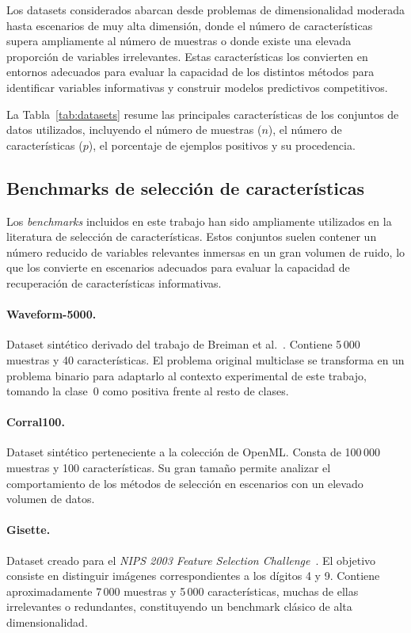 Los datasets considerados abarcan desde problemas de dimensionalidad moderada hasta escenarios de muy alta dimensión, donde el número de características supera ampliamente al número de muestras o donde existe una elevada proporción de variables irrelevantes. Estas características los convierten en entornos adecuados para evaluar la capacidad de los distintos métodos para identificar variables informativas y construir modelos predictivos competitivos.

La Tabla~\ref{tab:datasets} resume las principales características de los conjuntos de datos utilizados, incluyendo el número de muestras ($n$), el número de características ($p$), el porcentaje de ejemplos positivos y su procedencia.

\subsection{Benchmarks de selección de características}
\label{subsec:benchmarks}

Los \textit{benchmarks} incluidos en este trabajo han sido ampliamente utilizados en la literatura de selección de características. Estos conjuntos suelen contener un número reducido de variables relevantes inmersas en un gran volumen de ruido, lo que los convierte en escenarios adecuados para evaluar la capacidad de recuperación de características informativas.

\paragraph{Waveform-5000.}
Dataset sintético derivado del trabajo de Breiman et al.~\cite{breiman1984cart}. Contiene 5\,000 muestras y 40 características. El problema original multiclase se transforma en un problema binario para adaptarlo al contexto experimental de este trabajo, tomando la clase~0 como positiva frente al resto de clases.

\paragraph{Corral100.}
Dataset sintético perteneciente a la colección de OpenML. Consta de 100\,000 muestras y 100 características. Su gran tamaño permite analizar el comportamiento de los métodos de selección en escenarios con un elevado volumen de datos.

\paragraph{Gisette.}
Dataset creado para el \textit{NIPS 2003 Feature Selection Challenge}~\cite{guyon2004result}. El objetivo consiste en distinguir imágenes correspondientes a los dígitos 4 y 9. Contiene aproximadamente 7\,000 muestras y 5\,000 características, muchas de ellas irrelevantes o redundantes, constituyendo un benchmark clásico de alta dimensionalidad.

